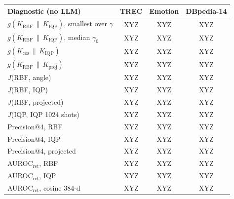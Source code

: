 \begin{tabular}{@{}l ccc@{}}
\toprule
Diagnostic (no LLM) & TREC & Emotion & DBpedia-14 \\
\midrule
$g(K_\mathrm{RBF}\,\|\,K_\mathrm{IQP})$, smallest over $\gamma$ & XYZ & XYZ & XYZ \\
$g(K_\mathrm{RBF}\,\|\,K_\mathrm{IQP})$, median $\gamma_0$ & XYZ & XYZ & XYZ \\
$g(K_\mathrm{cos}\,\|\,K_\mathrm{IQP})$ & XYZ & XYZ & XYZ \\
$g(K_\mathrm{RBF}\,\|\,K_\mathrm{proj})$ & XYZ & XYZ & XYZ \\
$J$(RBF, angle) & XYZ & XYZ & XYZ \\
$J$(RBF, IQP) & XYZ & XYZ & XYZ \\
$J$(RBF, projected) & XYZ & XYZ & XYZ \\
$J$(IQP, IQP 1024 shots) & XYZ & XYZ & XYZ \\
\midrule
Precision@4, RBF & XYZ & XYZ & XYZ \\
Precision@4, IQP & XYZ & XYZ & XYZ \\
Precision@4, projected & XYZ & XYZ & XYZ \\
AUROC$_\mathrm{ret}$, RBF & XYZ & XYZ & XYZ \\
AUROC$_\mathrm{ret}$, IQP & XYZ & XYZ & XYZ \\
AUROC$_\mathrm{ret}$, cosine 384-d & XYZ & XYZ & XYZ \\
\bottomrule
\end{tabular}
